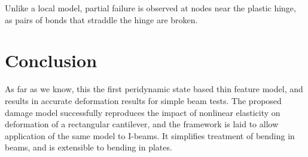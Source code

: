 \documentclass[preprint,review,12pt]{elsarticle}
\begin{document}
Unlike a local model, partial failure is observed at nodes near the plastic hinge, as pairs of bonds that straddle the hinge are broken.

\section{Conclusion}
\label{sec:Conclusion}

As far as we know, this the first peridynamic state based thin feature model, and results in accurate deformation results for simple beam tests.
The proposed damage model successfully reproduces the impact of nonlinear elasticity on deformation of a rectangular cantilever, and the framework is laid to allow application of the same model to I-beams.
It simplifies treatment of bending in beams, and is extensible to bending in plates.




\end{document}
